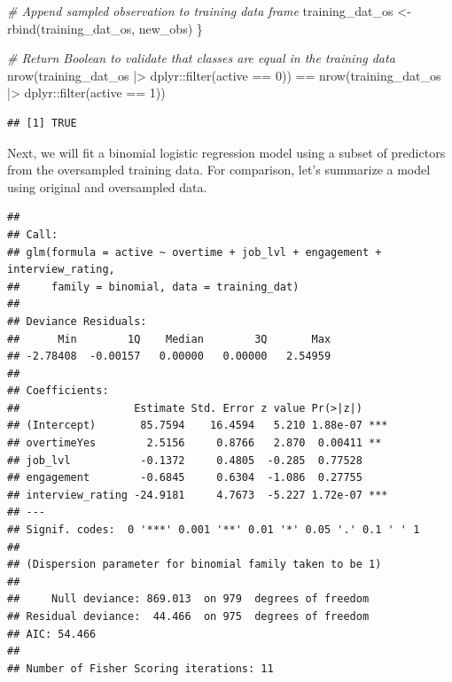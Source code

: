 \documentclass[
]{book}
\newenvironment{Shaded}{\begin{snugshade}}{\end{snugshade}}
\newcommand{\CommentTok}[1]{\textcolor[rgb]{0.56,0.35,0.01}{\textit{#1}}}
\newcommand{\DecValTok}[1]{\textcolor[rgb]{0.00,0.00,0.81}{#1}}
\newcommand{\FunctionTok}[1]{\textcolor[rgb]{0.00,0.00,0.00}{#1}}
\newcommand{\NormalTok}[1]{#1}
\newcommand{\OtherTok}[1]{\textcolor[rgb]{0.56,0.35,0.01}{#1}}
\newcommand{\SpecialCharTok}[1]{\textcolor[rgb]{0.00,0.00,0.00}{#1}}
\begin{document}
\begin{Shaded}
\begin{Highlighting}[]
  \CommentTok{\# Append sampled observation to training data frame}
\NormalTok{  training\_dat\_os }\OtherTok{\textless{}{-}} \FunctionTok{rbind}\NormalTok{(training\_dat\_os, new\_obs)}
\NormalTok{\}}

\CommentTok{\# Return Boolean to validate that classes are equal in the training data}
\FunctionTok{nrow}\NormalTok{(training\_dat\_os }\SpecialCharTok{|\textgreater{}}\NormalTok{ dplyr}\SpecialCharTok{::}\FunctionTok{filter}\NormalTok{(active }\SpecialCharTok{==} \DecValTok{0}\NormalTok{)) }\SpecialCharTok{==} \FunctionTok{nrow}\NormalTok{(training\_dat\_os }\SpecialCharTok{|\textgreater{}}\NormalTok{ dplyr}\SpecialCharTok{::}\FunctionTok{filter}\NormalTok{(active }\SpecialCharTok{==} \DecValTok{1}\NormalTok{))}
\end{Highlighting}
\end{Shaded}

\begin{verbatim}
## [1] TRUE
\end{verbatim}

Next, we will fit a binomial logistic regression model using a subset of predictors from the oversampled training data. For comparison, let's summarize a model using original and oversampled data.

\begin{verbatim}
## 
## Call:
## glm(formula = active ~ overtime + job_lvl + engagement + interview_rating, 
##     family = binomial, data = training_dat)
## 
## Deviance Residuals: 
##      Min        1Q    Median        3Q       Max  
## -2.78408  -0.00157   0.00000   0.00000   2.54959  
## 
## Coefficients:
##                  Estimate Std. Error z value Pr(>|z|)    
## (Intercept)       85.7594    16.4594   5.210 1.88e-07 ***
## overtimeYes        2.5156     0.8766   2.870  0.00411 ** 
## job_lvl           -0.1372     0.4805  -0.285  0.77528    
## engagement        -0.6845     0.6304  -1.086  0.27755    
## interview_rating -24.9181     4.7673  -5.227 1.72e-07 ***
## ---
## Signif. codes:  0 '***' 0.001 '**' 0.01 '*' 0.05 '.' 0.1 ' ' 1
## 
## (Dispersion parameter for binomial family taken to be 1)
## 
##     Null deviance: 869.013  on 979  degrees of freedom
## Residual deviance:  44.466  on 975  degrees of freedom
## AIC: 54.466
## 
## Number of Fisher Scoring iterations: 11
\end{verbatim}
\end{document}

